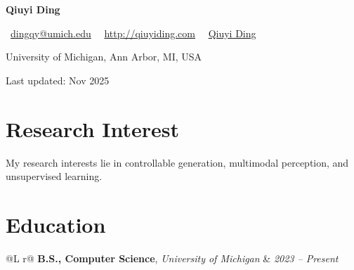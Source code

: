\documentclass[11pt,a4paper]{article}
\makeatletter
\newcommand{\cvname}[1]{%
  \begin{center}\LARGE\bfseries #1\end{center}
}
\newcommand{\cvcontact}[1]{%
  \begin{center}#1\end{center}
}
\newcommand{\cvaddress}[1]{%
  \begin{center}\small #1\end{center}
}
\newcommand{\cvupdated}[1]{%
  \begin{center}\footnotesize Last updated: #1\end{center}
}
\newcommand{\eduentry}[5]{%
  \vspace{4pt}
  \noindent\begin{tabularx}{\linewidth}{@{}L r@{}}
    \textbf{#1}, \textit{#2} & \textit{#4}
  \end{tabularx}\par
  \noindent{\small #3}\par
  \if\relax\detokenize{#5}\relax\else{\small #5\par}\fi
}
\makeatother
\begin{document}
\cvname{Qiuyi Ding}
\cvcontact{%
  \faEnvelope\ \href{mailto:dingqy@umich.edu}{dingqy@umich.edu}\ \quad
  \faLink\ \href{http://qiuyiding.com}{http://qiuyiding.com}\ \quad
  \faGoogle\ \href{https://scholar.google.com/citations?hl=en&user=sn4ACXUAAAAJ}{Qiuyi Ding}
}
\cvaddress{University of Michigan, Ann Arbor, MI, USA}
\cvupdated{Nov 2025}

\section{Research Interest}
My research interests lie in controllable generation, multimodal perception, and unsupervised learning.

\section{Education}
\eduentry{B.S., Computer Science}{University of Michigan}{}{2023 -- Present}{}

\end{document}
